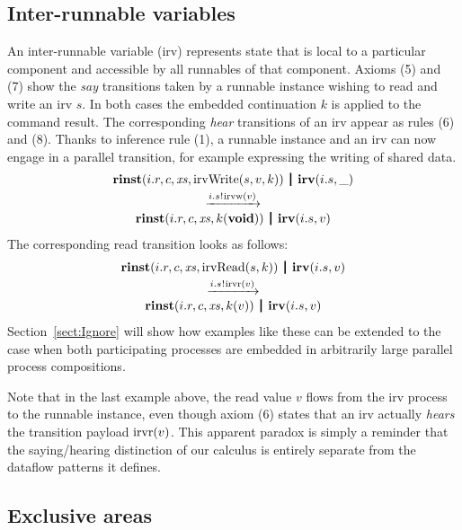 \documentclass[twocolumn]{article}
\begin{document}
\subsection{Inter-runnable variables}

An inter-runnable variable (irv) represents state that is local to a particular component and accessible by all runnables of that component. Axioms (5) and (7) show the \emph{say} transitions taken by a runnable instance wishing to read and write an irv $s$. In both cases the embedded continuation $k$ is applied to the command result. The corresponding \emph{hear} transitions of an irv appear as rules (6) and (8). Thanks to inference rule (1), a runnable instance and an irv can now engage in a parallel transition, for example expressing the writing of shared data.
$$
\begin{array}{c}
	\Tpar {\Trinst {i.r} c \Xs {\TrteIrvWrite s v k}}
	 	  {\Tirv {i.s} \_} \vspace{0.6ex} \\ 
	\red {\say {i.s} {\Tirvw v}} \\
	\Tpar {\Trinst {i.r} c \Xs {\Tap k \Tvoid}}
		  {\Tirv {i.s} v}
\end{array}
$$
The corresponding read transition looks as follows:
$$
\begin{array}{c}
	\Tpar {\Trinst {i.r} c \Xs {\TrteIrvRead s k}}
	 	  {\Tirv {i.s} v} \vspace{0.6ex} \\ 
	\red {\say {i.s} {\Tirvr v}} \\
	\Tpar {\Trinst {i.r} c \Xs {\Tap k v}}
		  {\Tirv {i.s} v}
\end{array}
$$
Section~\ref{sect:Ignore} will show how examples like these can be extended to the case when both participating processes are embedded in arbitrarily large parallel process compositions.

Note that in the last example above, the read value $v$ flows from the irv process to the runnable instance, even though axiom (6) states that an irv actually \emph{hears} the transition payload $\mathrm{irvr}(v)$. This apparent paradox is simply a reminder that the saying/hearing distinction of our calculus is entirely separate from the dataflow patterns it defines.


\subsection{Exclusive areas}
\end{document}
